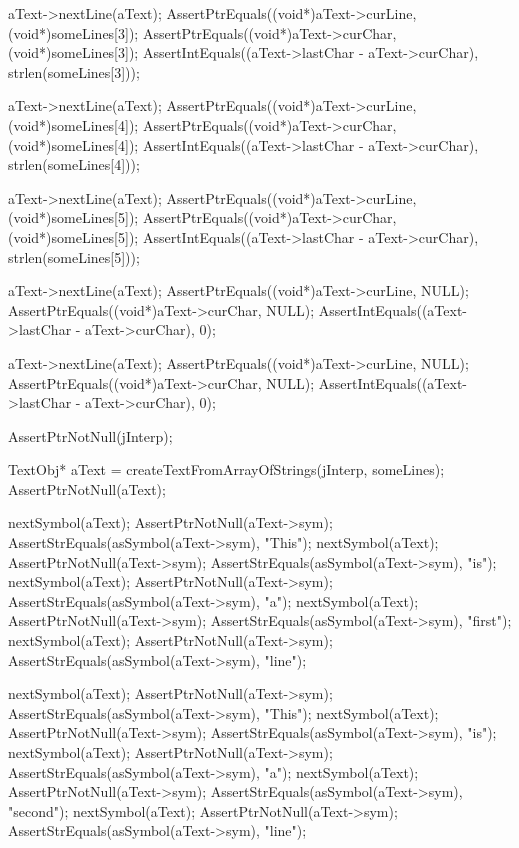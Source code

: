   aText->nextLine(aText);
  AssertPtrEquals((void*)aText->curLine, (void*)someLines[3]);
  AssertPtrEquals((void*)aText->curChar, (void*)someLines[3]);
  AssertIntEquals((aText->lastChar - aText->curChar),
                        strlen(someLines[3]));

  aText->nextLine(aText);
  AssertPtrEquals((void*)aText->curLine, (void*)someLines[4]);
  AssertPtrEquals((void*)aText->curChar, (void*)someLines[4]);
  AssertIntEquals((aText->lastChar - aText->curChar),
                        strlen(someLines[4]));

  aText->nextLine(aText);
  AssertPtrEquals((void*)aText->curLine, (void*)someLines[5]);
  AssertPtrEquals((void*)aText->curChar, (void*)someLines[5]);
  AssertIntEquals((aText->lastChar - aText->curChar),
                        strlen(someLines[5]));

  aText->nextLine(aText);
  AssertPtrEquals((void*)aText->curLine, NULL);
  AssertPtrEquals((void*)aText->curChar, NULL);
  AssertIntEquals((aText->lastChar - aText->curChar), 0);

  aText->nextLine(aText);
  AssertPtrEquals((void*)aText->curLine, NULL);
  AssertPtrEquals((void*)aText->curChar, NULL);
  AssertIntEquals((aText->lastChar - aText->curChar), 0);
\stopCTest
\stopTestCase

\startCTest
  AssertPtrNotNull(jInterp);

  TextObj* aText = createTextFromArrayOfStrings(jInterp, someLines);
  AssertPtrNotNull(aText);

  nextSymbol(aText);
  AssertPtrNotNull(aText->sym);
  AssertStrEquals(asSymbol(aText->sym), "This");
  nextSymbol(aText);
  AssertPtrNotNull(aText->sym);
  AssertStrEquals(asSymbol(aText->sym), "is");
  nextSymbol(aText);
  AssertPtrNotNull(aText->sym);
  AssertStrEquals(asSymbol(aText->sym), "a");
  nextSymbol(aText);
  AssertPtrNotNull(aText->sym);
  AssertStrEquals(asSymbol(aText->sym), "first");
  nextSymbol(aText);
  AssertPtrNotNull(aText->sym);
  AssertStrEquals(asSymbol(aText->sym), "line");

  nextSymbol(aText);
  AssertPtrNotNull(aText->sym);
  AssertStrEquals(asSymbol(aText->sym), "This");
  nextSymbol(aText);
  AssertPtrNotNull(aText->sym);
  AssertStrEquals(asSymbol(aText->sym), "is");
  nextSymbol(aText);
  AssertPtrNotNull(aText->sym);
  AssertStrEquals(asSymbol(aText->sym), "a");
  nextSymbol(aText);
  AssertPtrNotNull(aText->sym);
  AssertStrEquals(asSymbol(aText->sym), "second");
  nextSymbol(aText);
  AssertPtrNotNull(aText->sym);
  AssertStrEquals(asSymbol(aText->sym), "line");

